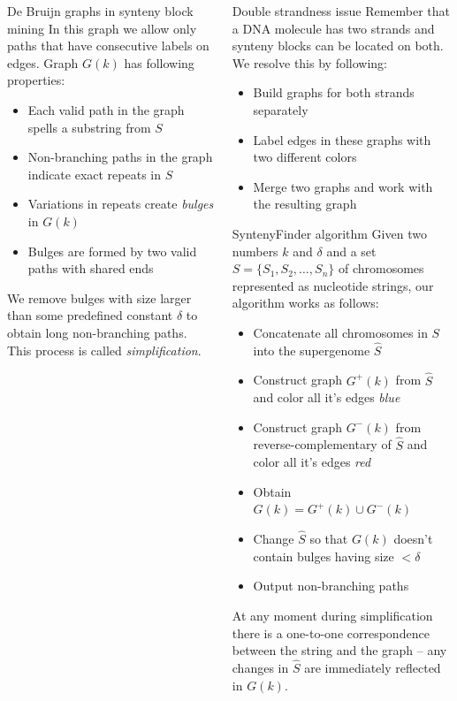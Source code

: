 \documentclass[final,hyperref={pdfpagelabels=false}]{beamer}
\begin{document}
\begin{frame}{}
\begin{columns}[t]
\begin{column}{0.32\linewidth}
\begin{block}{De Bruijn graphs in synteny block mining}
In this graph we allow only paths that have consecutive labels on edges.
Graph \(G(k)\) has following properties:

\begin{itemize}
\item Each valid path in the graph spells a substring from \(S\)
\item Non-branching paths in the graph indicate exact repeats in \(S\)
\item Variations in repeats create \textit{bulges} in \(G(k)\)
\item Bulges are formed by two valid paths with shared ends
\end{itemize}

We remove bulges with size larger than some predefined constant \(\delta\) to obtain long non-branching paths. This process is 
called \textit{simplification}.
\end{block}

\end{column}

\begin{column}{0.32\linewidth}

\begin{block}{Double strandness issue} \justifying
Remember that a DNA molecule has two strands and synteny blocks can be located on both. We 
resolve this by following:
\begin{itemize}
\item Build graphs for both strands separately
\item Label edges in these graphs with two different colors
\item Merge two graphs and work with the resulting graph 
\end{itemize}
\end{block}

\begin{block}{SyntenyFinder algorithm} \justifying
Given two numbers \(k\) and \(\delta\) and a set \(S = \lbrace S_{1}, S_{2}, \ldots, S_{n} \rbrace \) of chromosomes 
represented as nucleotide strings, our algorithm works as follows:
\begin{itemize}
\item Concatenate all chromosomes in \(S\) into the supergenome \(\hat{S}\)
\item Construct graph \(G ^ +(k)\) from \(\hat{S}\) and color all it's edges \textit{blue}
\item Construct graph \(G ^ -(k)\) from reverse-complementary of \(\hat{S}\) and color all it's edges \textit{red}
\item Obtain \(G(k) = G ^ +(k) \cup G ^ -(k)\) 
\item Change \(\hat{S}\) so that \(G(k)\) doesn't contain bulges having size \( < \delta \)
\item Output non-branching paths
\end{itemize}
At any moment during simplification there is a one-to-one correspondence between the string and the graph -- any changes in \(\hat{S}\) are immediately reflected in \(G(k)\).


\end{block}
\end{column}
\end{columns}
\end{frame}
\end{document}
